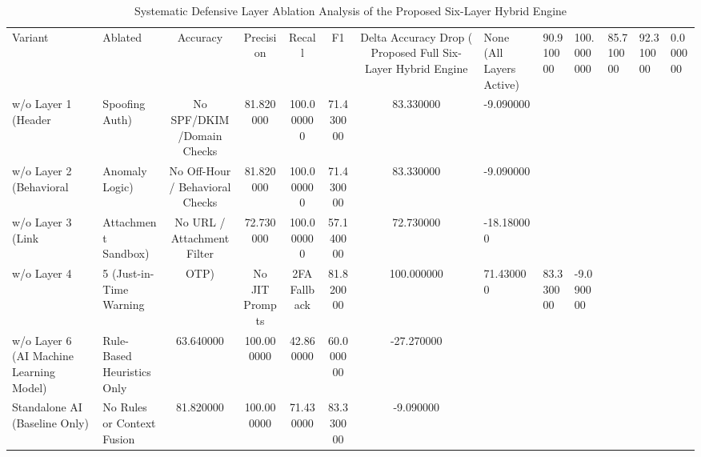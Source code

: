 \begin{table}
\caption{Systematic Defensive Layer Ablation Analysis of the Proposed Six-Layer Hybrid Engine}
\label{tab:ablation_study}
\begin{tabular}{llccccc}
\toprule
Variant & Ablated & Accuracy & Precision & Recall & F1 & Delta Accuracy Drop (%
\midrule
Proposed Full Six-Layer Hybrid Engine & None (All Layers Active) & 90.910000 & 100.000000 & 85.710000 & 92.310000 & 0.000000 \\
w/o Layer 1 (Header & Spoofing Auth) & No SPF/DKIM/Domain Checks & 81.820000 & 100.000000 & 71.430000 & 83.330000 & -9.090000 \\
w/o Layer 2 (Behavioral & Anomaly Logic) & No Off-Hour / Behavioral Checks & 81.820000 & 100.000000 & 71.430000 & 83.330000 & -9.090000 \\
w/o Layer 3 (Link & Attachment Sandbox) & No URL / Attachment Filter & 72.730000 & 100.000000 & 57.140000 & 72.730000 & -18.180000 \\
w/o Layer 4 & 5 (Just-in-Time Warning & OTP) & No JIT Prompts & 2FA Fallback & 81.820000 & 100.000000 & 71.430000 & 83.330000 & -9.090000 \\
w/o Layer 6 (AI Machine Learning Model) & Rule-Based Heuristics Only & 63.640000 & 100.000000 & 42.860000 & 60.000000 & -27.270000 \\
Standalone AI (Baseline Only) & No Rules or Context Fusion & 81.820000 & 100.000000 & 71.430000 & 83.330000 & -9.090000 \\
\bottomrule
\end{tabular}
\end{table}
